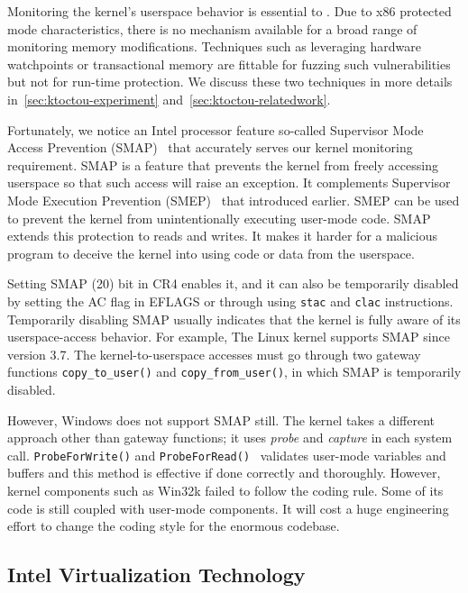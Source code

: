 Monitoring the kernel's userspace behavior is essential to \name. Due to x86 protected mode characteristics, there is no mechanism available for a broad range of monitoring memory modifications. Techniques such as leveraging hardware watchpoints or transactional memory are fittable for fuzzing such vulnerabilities but not for run-time protection. We discuss these two techniques in more details in~\autoref{sec:ktoctou-experiment} and~\autoref{sec:ktoctou-relatedwork}.

Fortunately, we notice an Intel processor feature so-called Supervisor Mode Access Prevention (SMAP)~\cite{corbet2012supervisorsmap} that accurately serves our kernel monitoring requirement.
SMAP is a feature that prevents the kernel from freely accessing userspace so that such access will raise an exception. It complements Supervisor Mode Execution Prevention (SMEP)~\cite{fischer2011supervisor} that introduced earlier. SMEP can be used to prevent the kernel from unintentionally executing user-mode code. SMAP extends this protection to reads and writes. It makes it harder for a malicious program to deceive the kernel into using code or data from the userspace.

Setting SMAP (20) bit in CR4 enables it, and it can also be temporarily disabled by setting the AC flag in EFLAGS or through using \texttt{stac} and \texttt{clac} instructions. Temporarily disabling SMAP usually indicates that the kernel is fully aware of its userspace-access behavior. For example, The Linux kernel supports SMAP since version 3.7. The kernel-to-userspace accesses must go through two gateway functions \texttt{copy\_to\_user()} and \texttt{copy\_from\_user()}, in which SMAP is temporarily disabled.

However, Windows does not support SMAP still. The kernel takes a different approach other than gateway functions; it uses \textit{probe} and \textit{capture} in each system call. \texttt{ProbeForWrite()}  and \texttt{ProbeForRead()}~\cite{probeforread} validates user-mode variables and buffers and this method is effective if done correctly and thoroughly. However, kernel components such as Win32k failed to follow the coding rule.  Some of its code is still coupled with user-mode components. It will cost a huge engineering effort to change the coding style for the enormous codebase.



\subsection{Intel Virtualization Technology}

